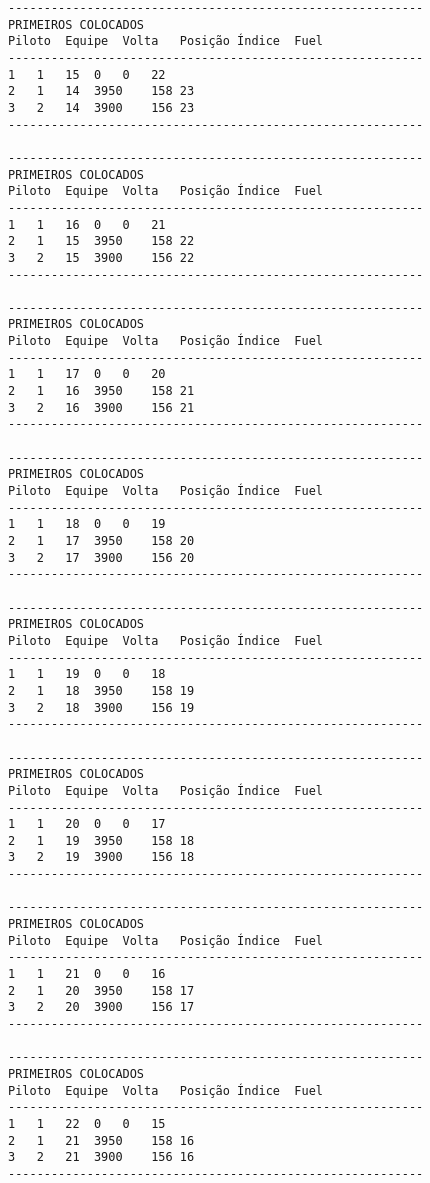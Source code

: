 \documentclass[12pt]{article}
\begin{document}
\begin{verbatim}
----------------------------------------------------------
PRIMEIROS COLOCADOS
Piloto	Equipe	Volta	Posição	Índice	Fuel
----------------------------------------------------------
1	1	15	0	0	22
2	1	14	3950	158	23
3	2	14	3900	156	23
----------------------------------------------------------

----------------------------------------------------------
PRIMEIROS COLOCADOS
Piloto	Equipe	Volta	Posição	Índice	Fuel
----------------------------------------------------------
1	1	16	0	0	21
2	1	15	3950	158	22
3	2	15	3900	156	22
----------------------------------------------------------

----------------------------------------------------------
PRIMEIROS COLOCADOS
Piloto	Equipe	Volta	Posição	Índice	Fuel
----------------------------------------------------------
1	1	17	0	0	20
2	1	16	3950	158	21
3	2	16	3900	156	21
----------------------------------------------------------

----------------------------------------------------------
PRIMEIROS COLOCADOS
Piloto	Equipe	Volta	Posição	Índice	Fuel
----------------------------------------------------------
1	1	18	0	0	19
2	1	17	3950	158	20
3	2	17	3900	156	20
----------------------------------------------------------

----------------------------------------------------------
PRIMEIROS COLOCADOS
Piloto	Equipe	Volta	Posição	Índice	Fuel
----------------------------------------------------------
1	1	19	0	0	18
2	1	18	3950	158	19
3	2	18	3900	156	19
----------------------------------------------------------

----------------------------------------------------------
PRIMEIROS COLOCADOS
Piloto	Equipe	Volta	Posição	Índice	Fuel
----------------------------------------------------------
1	1	20	0	0	17
2	1	19	3950	158	18
3	2	19	3900	156	18
----------------------------------------------------------

----------------------------------------------------------
PRIMEIROS COLOCADOS
Piloto	Equipe	Volta	Posição	Índice	Fuel
----------------------------------------------------------
1	1	21	0	0	16
2	1	20	3950	158	17
3	2	20	3900	156	17
----------------------------------------------------------

----------------------------------------------------------
PRIMEIROS COLOCADOS
Piloto	Equipe	Volta	Posição	Índice	Fuel
----------------------------------------------------------
1	1	22	0	0	15
2	1	21	3950	158	16
3	2	21	3900	156	16
----------------------------------------------------------


\end{verbatim}
\end{document}
